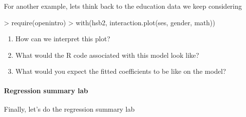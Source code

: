 \documentclass[10pt]{article}
\newcommand{\shortans}{\vspace{1in}}
\begin{document}
For another example, lets think back to the education data we keep considering

\begin{Schunk}
\begin{Sinput}
> require(openintro)
> with(hsb2, interaction.plot(ses, gender, math))
\end{Sinput}
\end{Schunk}

\begin{enumerate}
  \itemsep1in
  \item How can we interpret this plot?
  \item What would the R code associated with this model look like?
  \item What would you expect the fitted coefficients to be like on the  model?
  \shortans
\end{enumerate}

\clearpage

\clearpage

\paragraph{Regression summary lab} Finally, let's do the regression summary lab
\end{document}
